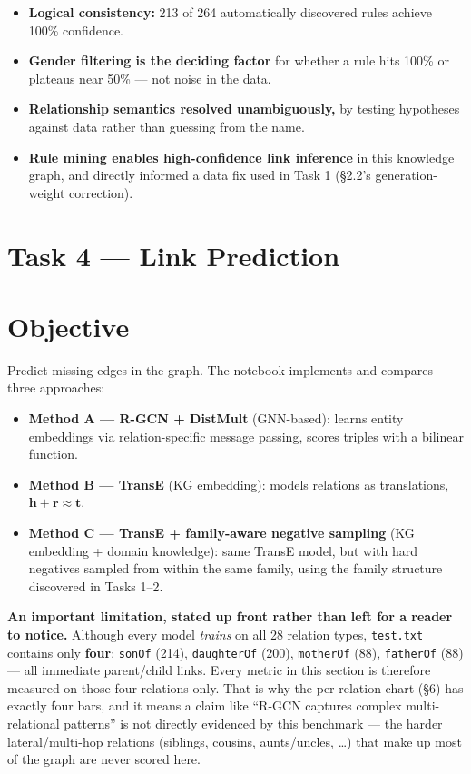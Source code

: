 \documentclass[11pt,a4paper]{article}
\newcommand{\rel}[1]{\texttt{\small #1}}
\newcounter{tasknum}
\newcommand{\starttask}[1]{%
  \clearpage
  \stepcounter{tasknum}%
  \setcounter{section}{0}%
  \setcounter{subsection}{0}%
  \section*{#1}%
  \addcontentsline{toc}{section}{#1}%
}
\begin{document}
\begin{itemize}[leftmargin=1.4em,itemsep=3pt]
\item \textbf{Logical consistency:} 213 of 264 automatically discovered
      rules achieve 100\% confidence.
\item \textbf{Gender filtering is the deciding factor} for whether a rule
      hits 100\% or plateaus near 50\% --- not noise in the data.
\item \textbf{Relationship semantics resolved unambiguously,} by testing
      hypotheses against data rather than guessing from the name.
\item \textbf{Rule mining enables high-confidence link inference} in this
      knowledge graph, and directly informed a data fix used in Task 1
      (\S2.2's generation-weight correction).
\end{itemize}

\starttask{Task 4 --- Link Prediction}

\section{Objective}

Predict missing edges in the graph. The notebook implements and compares
three approaches:

\begin{itemize}[leftmargin=1.4em,itemsep=2pt]
\item \textbf{Method A --- R-GCN + DistMult} (GNN-based): learns entity
      embeddings via relation-specific message passing, scores triples
      with a bilinear function.
\item \textbf{Method B --- TransE} (KG embedding): models relations as
      translations, $\mathbf{h}+\mathbf{r}\approx\mathbf{t}$.
\item \textbf{Method C --- TransE + family-aware negative sampling} (KG
      embedding + domain knowledge): same TransE model, but with hard
      negatives sampled from within the same family, using the family
      structure discovered in Tasks 1--2.
\end{itemize}

\begin{why}
\textbf{An important limitation, stated up front rather than left for a
reader to notice.} Although every model \emph{trains} on all 28 relation
types, \texttt{test.txt} contains only \textbf{four}: \rel{sonOf} (214),
\rel{daughterOf} (200), \rel{motherOf} (88), \rel{fatherOf} (88) --- all
immediate parent/child links. Every metric in this section is therefore
measured on those four relations only. That is why the per-relation chart
(\S6) has exactly four bars, and it means a claim like ``R-GCN captures
complex multi-relational patterns'' is not directly evidenced by this
benchmark --- the harder lateral/multi-hop relations (siblings, cousins,
aunts/uncles, \ldots) that make up most of the graph are never scored
here.
\end{why}
\end{document}
